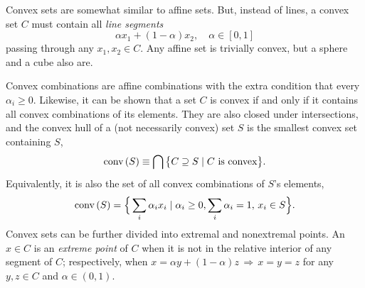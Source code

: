 		Convex sets are somewhat similar to affine sets. But, instead of lines, a convex set $C$ must contain all \emph{line segments}
		$$
			\alpha x_1 + (1 - \alpha) x_2, \quad\alpha \in [0,1]
		$$
		passing through any $x_1, x_2 \in C$. Any affine set is trivially convex, but a sphere and a cube also are.

		Convex combinations are affine combinations with the extra condition that every $\alpha_i \geq 0$. Likewise, it can be shown that a set $C$ is convex if and only if it contains all convex combinations of its elements. They are also closed under intersections, and the convex hull of a (not necessarily convex) set $S$ is the smallest convex set containing $S$,
		$$
			\text{conv} \left( S \right) \equiv \bigcap \big\{ C \supseteq S \mid C \text{ is convex} \big\} .
		$$
		Equivalently, it is also the set of all convex combinations of $S$'s elements,
		\begin{equation}
			\text{conv} \left( S \right) = \Big\{ \sum_i \alpha_i x_i \mid \alpha_i \geq 0, \sum_i \alpha_i = 1, \, x_i \in S \Big\} .
		\label{eq:convex-hull}
		\end{equation}
		Convex sets can be further divided into extremal and nonextremal points. An $x \in C$ is an \emph{extreme point} of $C$ when it is not in the relative interior of any segment of $C$; respectively, when $x = \alpha y + (1 - \alpha) z \,\Rightarrow\, x=y=z$ for any $y, z \in C$ and $\alpha \in (0, 1)$.

